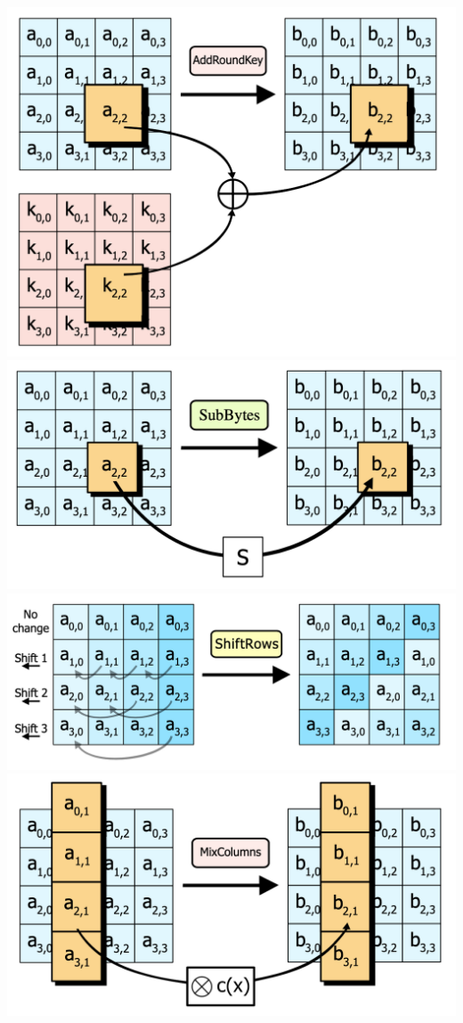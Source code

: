 \documentclass[11pt,a4paper]{report}
\begin{document}
\begin{center}
\includegraphics[scale=0.3]{img/img5.png}
\includegraphics[scale=0.3]{img/img6.png}
\includegraphics[scale=0.3]{img/img7.png}
\includegraphics[scale=0.3]{img/img8.png}
\end{center}
\end{document}

